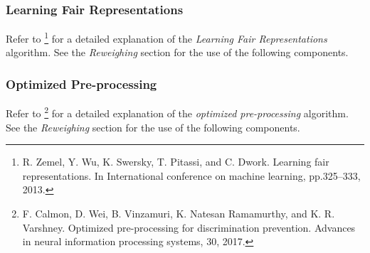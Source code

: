 \subsubsection{Learning Fair Representations}

Refer to 
\footnote{R. Zemel, Y. Wu, K. Swersky, T. Pitassi, and C. Dwork. Learning fair representations. In International conference on machine learning, pp.325–333, 2013.} 
for a detailed explanation of the \emph{Learning Fair Representations} algorithm.
See the \emph{Reweighing} section for the use of the following components.

\begin{VCSet}
    \begin{visualComponent}
    \end{visualComponent}
    
    \begin{visualComponent}
    \end{visualComponent}
    
    \begin{visualComponent}
    \end{visualComponent}
\end{VCSet}


\subsubsection{Optimized Pre-processing}
Refer to 
\footnote{F. Calmon, D. Wei, B. Vinzamuri, K. Natesan Ramamurthy, and K. R. Varshney. Optimized pre-processing for discrimination prevention. Advances in neural information processing systems, 30, 2017.} 
for a detailed explanation of the \emph{optimized pre-processing} algorithm.
See the \emph{Reweighing} section for the use of the following components.

\begin{VCSet}
    \begin{visualComponent}
    \end{visualComponent}
    
    \begin{visualComponent}
    \end{visualComponent}
    
    \begin{visualComponent}
    \end{visualComponent}
\end{VCSet}

